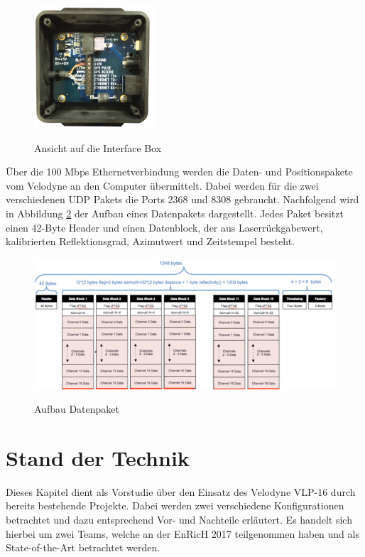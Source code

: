 \begin{figure}[H]
	\centering
	\includegraphics[width=0.4\textwidth]
	{resources/InterfaceBox.PNG}
	\caption[Ansicht auf die Interfacebox]{Ansicht auf die Interface Box} \protect\cite{velodyne}
	\label{fig:InterfaceBox}
\end{figure}

Über die 100 Mbps Ethernetverbindung werden die Daten- und Positionspakete vom Velodyne an den Computer übermittelt. Dabei werden für die zwei verschiedenen \ac{UDP} Pakets die Ports 2368 und 8308 gebraucht. Nachfolgend wird in Abbildung \ref{fig:datapakets} der Aufbau eines Datenpakets dargestellt. Jedes Paket besitzt einen 42-Byte Header und einen Datenblock, der aus Laserrückgabewert, kalibrierten Reflektionsgrad, Azimutwert und Zeitstempel besteht.

\begin{figure}[H]
	\centering
	\includegraphics[width=1.0\textwidth]
	{resources/datapakets.PNG}
	\caption[Aufbau Datenpaket]{Aufbau Datenpaket} \protect\cite{velodyne}
	\label{fig:datapakets}
\end{figure}


\section{Stand der Technik}
 \label{sec:Vorzeigeprojekte}
 Dieses Kapitel dient als Vorstudie über den Einsatz des Velodyne VLP-16 durch bereits bestehende Projekte. Dabei werden zwei verschiedene Konfigurationen betrachtet und dazu entsprechend Vor- und Nachteile erläutert. Es handelt sich hierbei um zwei Teams, welche an der \ac{EnRicH} 2017 teilgenommen haben und als State-of-the-Art betrachtet werden.
 
